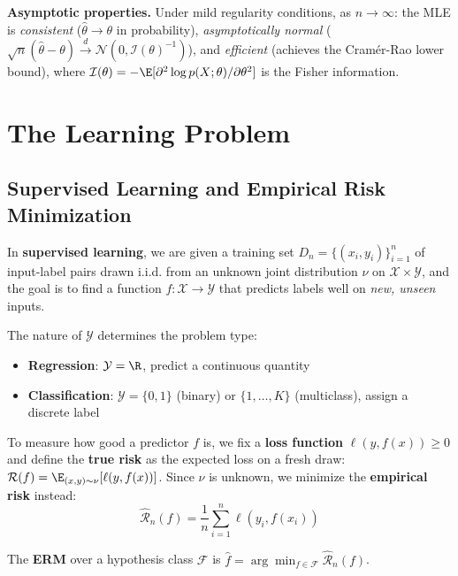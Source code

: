 \documentclass[main.tex]{subfiles}
\begin{document}
\textbf{Asymptotic properties.} Under mild regularity conditions, as $n \to \infty$: the MLE is \textit{consistent} ($\hat{\theta} \to \theta$ in probability), \textit{asymptotically normal} ($\sqrt{n}(\hat{\theta} - \theta) \xrightarrow{d} \mathcal{N}(0, \mathcal{I}(\theta)^{-1})$), and \textit{efficient} (achieves the Cram\'er-Rao lower bound), where $\mathcal{I}(\theta) = -\E[\partial^2 \log p(X;\theta)/\partial\theta^2]$ is the Fisher information.

\needspace{0.33\textheight}
\section{The Learning Problem}

\subsection{Supervised Learning and Empirical Risk Minimization}

In \textbf{supervised learning}, we are given a training set $D_n = \{(x_i, y_i)\}_{i=1}^n$ of input-label pairs drawn i.i.d. from an unknown joint distribution $\nu$ on $\mathcal{X} \times \mathcal{Y}$, and the goal is to find a function $f : \mathcal{X} \to \mathcal{Y}$ that predicts labels well on \textit{new, unseen} inputs.

The nature of $\mathcal{Y}$ determines the problem type:
\begin{itemize}
    \item \textbf{Regression}: $\mathcal{Y} = \R$, predict a continuous quantity
    \item \textbf{Classification}: $\mathcal{Y} = \{0, 1\}$ (binary) or $\{1, \ldots, K\}$ (multiclass), assign a discrete label
\end{itemize}

To measure how good a predictor $f$ is, we fix a \textbf{loss function} $\ell(y, f(x)) \geq 0$ and define the \textbf{true risk} as the expected loss on a fresh draw: $\mathcal{R}(f) = \E_{(x,y) \sim \nu}[\ell(y, f(x))]$. Since $\nu$ is unknown, we minimize the \textbf{empirical risk} instead:
$$\hat{\mathcal{R}}_n(f) = \frac{1}{n}\sum_{i=1}^{n}\ell(y_i, f(x_i))$$

\begin{definition}
The \textbf{ERM} over a hypothesis class $\mathcal{F}$ is $\hat{f} = \arg\min_{f \in \mathcal{F}}\hat{\mathcal{R}}_n(f)$.
\end{definition}
\end{document}
